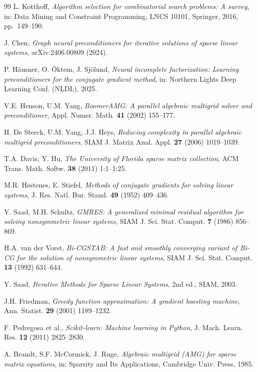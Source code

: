 \documentclass[11pt]{article}
\begin{document}
\begin{thebibliography}{99}
 L. Kotthoff, \emph{Algorithm selection for combinatorial
search problems: A survey}, in: Data Mining and Constraint Programming, LNCS
10101, Springer, 2016, pp.~149--190.

 J. Chen, \emph{Graph neural preconditioners for iterative
solutions of sparse linear systems}, arXiv:2406.00809 (2024).

 P. H\"ausner, O. \"Oktem, J. Sj\"olund, \emph{Neural
incomplete factorization: Learning preconditioners for the conjugate gradient
method}, in: Northern Lights Deep Learning Conf. (NLDL), 2025.

 V.E. Henson, U.M. Yang, \emph{BoomerAMG: A parallel
algebraic multigrid solver and preconditioner}, Appl. Numer. Math. \textbf{41}
(2002) 155--177.

 H. De Sterck, U.M. Yang, J.J. Heys, \emph{Reducing
complexity in parallel algebraic multigrid preconditioners}, SIAM J. Matrix
Anal. Appl. \textbf{27} (2006) 1019--1039.

 T.A. Davis, Y. Hu, \emph{The University of Florida sparse
matrix collection}, ACM Trans. Math. Softw. \textbf{38} (2011) 1:1--1:25.

 M.R. Hestenes, E. Stiefel, \emph{Methods of conjugate
gradients for solving linear systems}, J. Res. Natl. Bur. Stand. \textbf{49}
(1952) 409--436.

 Y. Saad, M.H. Schultz, \emph{GMRES: A generalized minimal
residual algorithm for solving nonsymmetric linear systems}, SIAM J. Sci.
Stat. Comput. \textbf{7} (1986) 856--869.

 H.A. van der Vorst, \emph{Bi-CGSTAB: A fast and
smoothly converging variant of Bi-CG for the solution of nonsymmetric linear
systems}, SIAM J. Sci. Stat. Comput. \textbf{13} (1992) 631--644.

 Y. Saad, \emph{Iterative Methods for Sparse Linear Systems},
2nd ed., SIAM, 2003.

 J.H. Friedman, \emph{Greedy function approximation: A
gradient boosting machine}, Ann. Statist. \textbf{29} (2001) 1189--1232.

 F. Pedregosa et al., \emph{Scikit-learn: Machine learning in
Python}, J. Mach. Learn. Res. \textbf{12} (2011) 2825--2830.

 A. Brandt, S.F. McCormick, J. Ruge, \emph{Algebraic
multigrid (AMG) for sparse matrix equations}, in: Sparsity and Its
Applications, Cambridge Univ. Press, 1985.


\end{thebibliography}
\end{document}

